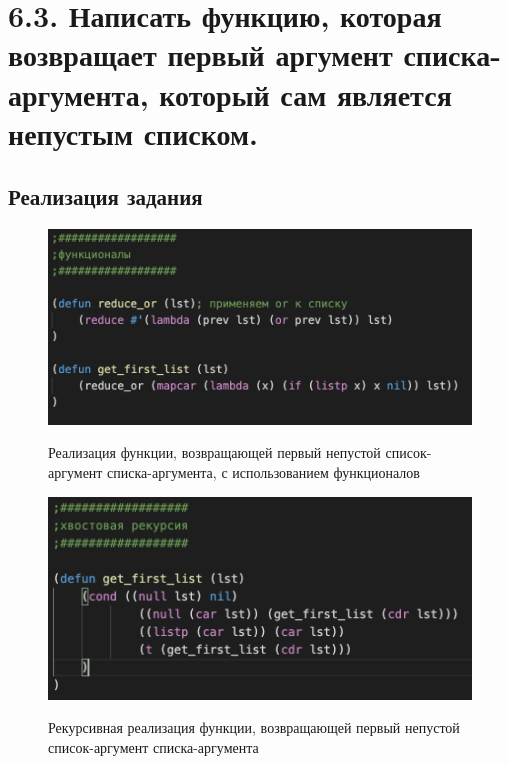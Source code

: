\documentclass[a4paper,12pt]{article}
\begin{document}
 	
 	\newpage
 	
 	\section*{6.3. Написать функцию, которая возвращает первый аргумент списка-аргумента, который сам является непустым списком.
 	}
 	
 	\subsection*{Реализация задания}
 	
 	\begin{figure}[h!]
 		\begin{center}
 			{\includegraphics[scale = 1.0]{6.3f.png}}
 			\label{ris:6.3f}
 		\end{center}
 	\caption{Реализация функции, возвращающей первый непустой список-аргумент списка-аргумента, с использованием функционалов}
 	\end{figure}
 
 
  	\begin{figure}[h!]
 	\begin{center}
 		{\includegraphics[scale = 1.0]{6.3r.png}}
 		\label{ris:6.3r}
 	\end{center}
 \caption{Рекурсивная реализация функции, возвращающей первый непустой список-аргумент списка-аргумента}
 \end{figure}
 	
\end{document}
